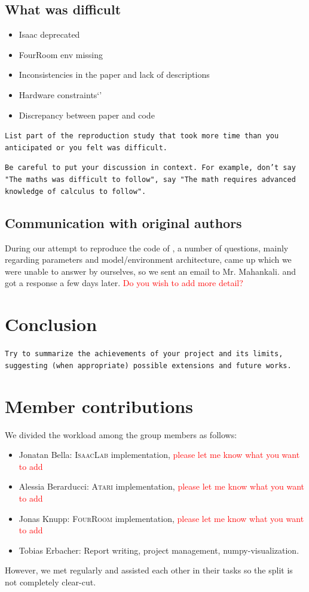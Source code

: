 \documentclass[10pt]{article} %
\begin{document}
\subsection{What was difficult}
\begin{itemize}
  \item Isaac deprecated 
  \item FourRoom env missing
  \item Inconsistencies in the paper and lack of descriptions
  \item Hardware constraints`'
  \item Discrepancy between paper and code
\end{itemize}
\texttt{List part of the reproduction study that took more time than you anticipated or you felt was difficult.}

\texttt{Be careful to put your discussion in context. For example, don't say "The maths was difficult to follow", say "The math requires advanced knowledge of calculus to follow".}

\subsection{Communication with original authors}

\noindent During our attempt to reproduce the code of \cite{rle-paper}, a number of questions, mainly regarding parameters and model/environment architecture, came up which we were unable to answer by ourselves, so we sent an email to Mr. Mahankali. and got a response a few days later. \textcolor{red}{Do you wish to add more detail?}

\section{Conclusion}
\texttt{Try to summarize the achievements of your project and its limits, suggesting (when appropriate) possible extensions and future works.}

\section*{Member contributions}

\noindent We divided the workload among the group members as follows:

\begin{itemize}
  \item Jonatan Bella: \textsc{IsaacLab} implementation, \textcolor{red}{please let me know what you want to add}
  \item Alessia Berarducci: \textsc{Atari} implementation, \textcolor{red}{please let me know what you want to add}
  \item Jonas Knupp: \textsc{FourRoom} implementation, \textcolor{red}{please let me know what you want to add}
  \item Tobias Erbacher: Report writing, project management, numpy-visualization.
\end{itemize}

\noindent However, we met regularly and assisted each other in their tasks so the split is not completely clear-cut.






\end{document}
